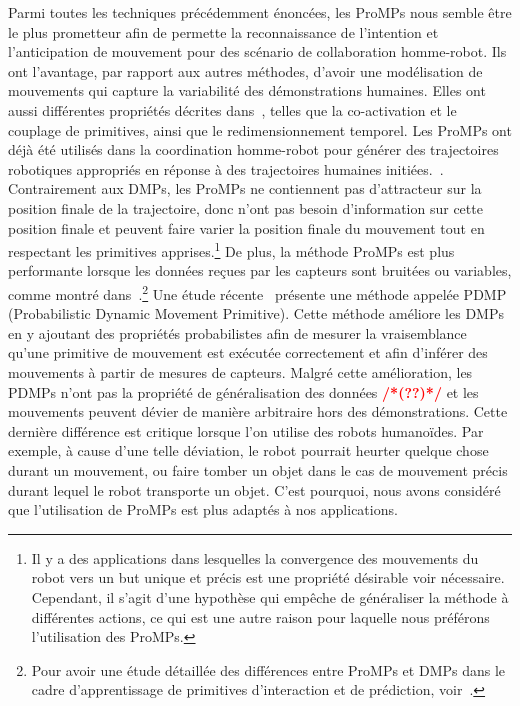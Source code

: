 \documentclass[utf8]{frontiersSCNS} %
\newcommand{\todo}[1]{\textcolor{red}{\textbf{/*#1*/}}}
\begin{document}
Parmi toutes les techniques précédemment énoncées, les ProMPs nous semble être le plus prometteur afin de permette la reconnaissance de l'intention et l'anticipation de mouvement pour des scénario de collaboration homme-robot.
Ils ont l'avantage, par rapport aux autres méthodes, d'avoir une modélisation de mouvements qui capture la variabilité des démonstrations humaines. Elles ont aussi différentes propriétés décrites dans~\cite{paraschos2013probabilistic}, telles que la co-activation et le couplage de primitives, ainsi que le redimensionnement temporel.
Les ProMPs ont déjà été utilisés dans la coordination homme-robot pour générer des trajectoires robotiques appropriés en réponse à des trajectoires humaines initiées.~\citep{maeda2016probabilistic}. 
Contrairement aux DMPs, les ProMPs ne contiennent pas d'attracteur sur la position finale de la trajectoire, donc n'ont pas besoin d'information sur cette position finale et peuvent faire varier la position finale du mouvement tout en respectant les primitives apprises.\footnote{Il y a des applications dans lesquelles la convergence des mouvements du robot vers un but unique et précis est une propriété désirable voir nécessaire. Cependant, il s'agit d'une hypothèse qui empêche de généraliser la méthode à différentes actions, ce qui est une autre raison pour laquelle nous préférons l'utilisation des ProMPs.} De plus, la méthode ProMPs est plus performante lorsque les données reçues par les capteurs sont bruitées ou variables, comme montré dans~\citep{maeda2014learning}.\footnote{Pour avoir une étude détaillée des différences entre ProMPs et DMPs dans le cadre d'apprentissage de primitives d'interaction et de prédiction, voir~\citep{maeda2014learning}.}
Une étude récente~\cite{meier2016probabilistic} présente une méthode appelée PDMP (Probabilistic Dynamic Movement Primitive). Cette méthode améliore les DMPs en y ajoutant des propriétés probabilistes afin de mesurer la vraisemblance qu'une primitive de mouvement est exécutée correctement et afin d'inférer des mouvements à partir de mesures de capteurs. Malgré cette amélioration, les PDMPs n'ont pas la propriété de généralisation des données \todo{(??)} et les mouvements peuvent dévier de manière arbitraire hors des démonstrations. Cette dernière différence est critique lorsque l'on utilise des robots humanoïdes. Par exemple, à cause d'une telle déviation, le robot pourrait heurter quelque chose durant un mouvement, ou faire tomber un objet dans le cas de mouvement précis durant lequel le robot transporte un objet. C'est pourquoi, nous avons considéré que l'utilisation de ProMPs est plus adaptés à nos applications.
\end{document}
